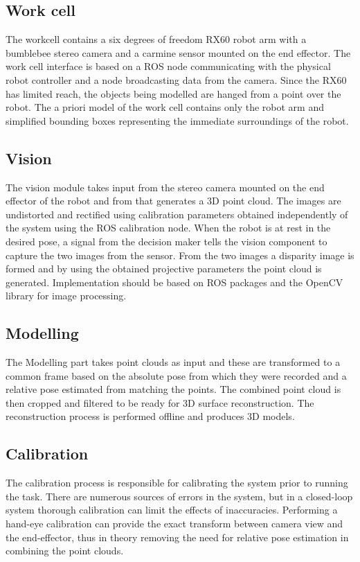 \subsection{Work cell}
The workcell contains a six degrees of freedom RX60 robot arm with a bumblebee stereo camera and a carmine sensor mounted on the end effector. The work cell interface is based on a ROS node communicating with the physical robot controller and a node broadcasting data from the camera. Since the RX60 has limited reach, the objects being modelled are hanged from a point over the robot. The a priori model of the work cell contains only the robot arm and simplified bounding boxes representing the immediate surroundings of the robot. 

\subsection{Vision}
The vision module takes input from the stereo camera mounted on the end effector of the robot and from that generates a 3D point cloud. The images are undistorted and rectified using calibration parameters obtained independently of the system using the ROS calibration node. When the robot is at rest in the desired pose, a signal from the decision maker tells the vision component to capture the two images from the sensor. From the two images a disparity image is formed and by using the obtained projective parameters the point cloud is generated. Implementation should be based on ROS packages and the OpenCV library for image processing.

\subsection{Modelling}
The Modelling part takes point clouds as input and these are transformed to a common frame based on the absolute pose from which they were recorded and a relative pose estimated from matching the points. The combined point cloud is then cropped and filtered to be ready for 3D surface reconstruction. The reconstruction process is performed offline and produces 3D models.

\subsection{Calibration}
The calibration process is responsible for calibrating the system prior to running the task. There are numerous sources of errors in the system, but in a closed-loop system thorough calibration can limit the effects of inaccuracies. Performing a hand-eye calibration can provide the exact transform between camera view and the end-effector, thus in theory removing the need for relative pose estimation in combining the point clouds.


